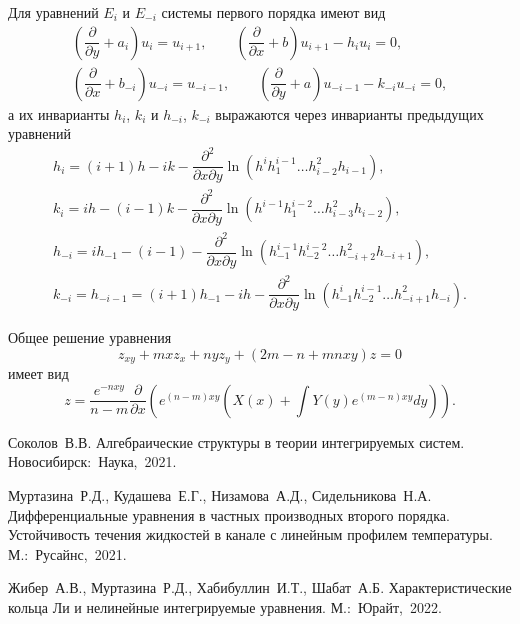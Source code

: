 		Для уравнений $E_i$ и $E_{-i}$ системы первого порядка имеют вид
$$
\begin{array}{l}
	  		\left(\dfrac{\partial}{\partial y}+a_{i}\right)u_{i}=u_{i+1},\qquad  \left(\dfrac{\partial}{\partial x}+b\right)u_{i+1}-h_{i}u_{i}=0,\\
  	  	\left(\dfrac{\partial}{\partial x}+b_{-i}\right)u_{-i}=u_{-i-1},\qquad  \left(\dfrac{\partial}{\partial y}+a\right)u_{-i-1}-k_{-i}u_{-i}=0,
				\end{array}
$$
 а  их инварианты $h_i$, $k_i$ и $h_{-i}$, $k_{-i}$ выражаются через инварианты предыдущих уравнений 
$$
\begin{array}{l}
 	  	h_i=(i+1)h-ik-\dfrac{\partial^{2}}{\partial x\partial y}\ln (h^ih_1^{i-1}\ldots h_{i-2}^{2} h_{i-1}),\\
 	  	k_{i}=ih-(i-1)k-\dfrac{\partial^{2}}{\partial x\partial y}\ln (h^{i-1} h_1^{i-2}\ldots h_{i-3}^{2} h_{i-2}),\\
 	  		h_{-i}=ih_{-1}-(i-1)-\dfrac{\partial^{2}}{\partial x\partial y}\ln (h^{i-1}_{-1}h_{-2}^{i-2}\ldots h_{-i+2}^{2} h_{-i+1}),\\
 	  		k_{-i}=h_{-i-1}=(i+1)h_{-1}-ih-\dfrac{\partial^{2}}{\partial x\partial y}\ln (h^i_{-1}h_{-2}^{i-1}\ldots h_{-i+1}^{2} h_{-i}).
 	  	\end{array}
 	  $$ 

Общее решение уравнения
$$
z_{xy}+mxz_{x}+nyz_{y}+(2m-n+mnxy)z=0
$$
имеет вид 
$$
z=\dfrac{e^{-nxy}}{n-m}\dfrac{\partial}{\partial x}\left(e^{(n-m)xy}\left(X(x)+\int Y(y)e^{(m-n)xy}dy \right) \right).
$$


\begin{thebibliography}{9} %

 Соколов~В.В. Алгебраические структуры в теории интегрируемых систем. Новосибирск:~Наука,~2021.

	Муртазина~Р.Д., Кудашева~Е.Г., Низамова~А.Д., Сидельникова~Н.А. Дифференциальные уравнения в частных производных второго порядка. Устойчивость течения жидкостей в канале с линейным профилем температуры. М.:~Русайнс,~2021.


	Жибер~А.В., Муртазина~Р.Д., Хабибуллин~И.Т., Шабат~А.Б.  Характеристические кольца Ли и нелинейные интегрируемые уравнения. М.:~Юрайт,~2022.


\end{thebibliography}





%

